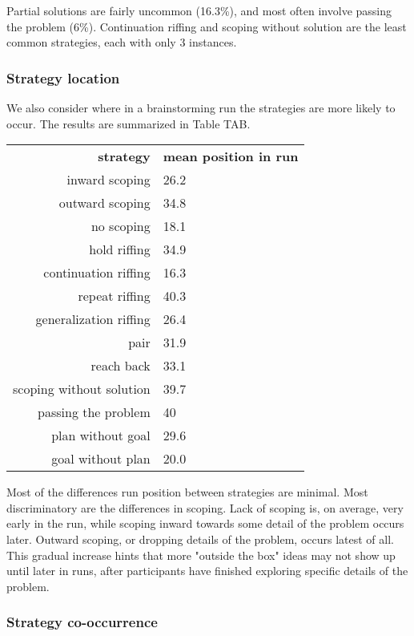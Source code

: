 Partial solutions are fairly uncommon (16.3\%), and most often involve passing the problem (6\%). Continuation riffing and scoping without solution are the least common strategies, each with only 3 instances.

\subsubsection{Strategy location}

We also consider where in a brainstorming run the strategies are more likely to occur. The results are summarized in Table TAB.

\begin{table}
    \begin{tabular}{r | l}
        \textbf{strategy} & \textbf{mean position in run} \\
        inward scoping & 26.2 \\
        outward scoping & 34.8 \\
        no scoping & 18.1 \\
        \hline \hline
        hold riffing & 34.9 \\
        continuation riffing & 16.3 \\
        repeat riffing & 40.3 \\
        generalization riffing & 26.4 \\
        \hline
        pair & 31.9 \\
        reach back & 33.1 \\
        \hline \hline
        scoping without solution & 39.7 \\
        passing the problem & 40 \\
        plan without goal & 29.6 \\
        goal without plan & 20.0 \\ 
    \end{tabular}
\end{table}

Most of the differences run position between strategies are minimal. Most discriminatory are the differences in scoping. Lack of scoping is, on average, very early in the run, while scoping inward towards some detail of the problem occurs later. Outward scoping, or dropping details of the problem, occurs latest of all. This gradual increase hints that more "outside the box" ideas may not show up until later in runs, after participants have finished exploring specific details of the problem.

\subsubsection{Strategy co-occurrence}

